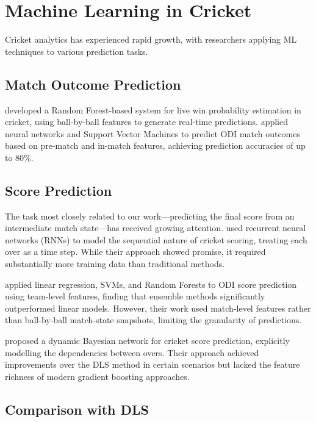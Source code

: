 \documentclass[12pt,a4paper,oneside]{report}
\begin{document}
\section{Machine Learning in Cricket}

Cricket analytics has experienced rapid growth, with researchers applying ML techniques to various prediction tasks.

\subsection{Match Outcome Prediction}

\citet{sankaranarayanan2014auto} developed a Random Forest-based system for live win probability estimation in cricket, using ball-by-ball features to generate real-time predictions. \citet{passi2018cricket} applied neural networks and Support Vector Machines to predict ODI match outcomes based on pre-match and in-match features, achieving prediction accuracies of up to 80\%.

\subsection{Score Prediction}

The task most closely related to our work---predicting the final score from an intermediate match state---has received growing attention. \citet{deep2016learning} used recurrent neural networks (RNNs) to model the sequential nature of cricket scoring, treating each over as a time step. While their approach showed promise, it required substantially more training data than traditional methods.

\citet{jhanwar2016predicting} applied linear regression, SVMs, and Random Forests to ODI score prediction using team-level features, finding that ensemble methods significantly outperformed linear models. However, their work used match-level features rather than ball-by-ball match-state snapshots, limiting the granularity of predictions.

\citet{viswanadha2017dynamic} proposed a dynamic Bayesian network for cricket score prediction, explicitly modelling the dependencies between overs. Their approach achieved improvements over the DLS method in certain scenarios but lacked the feature richness of modern gradient boosting approaches.

\subsection{Comparison with DLS}
\end{document}
